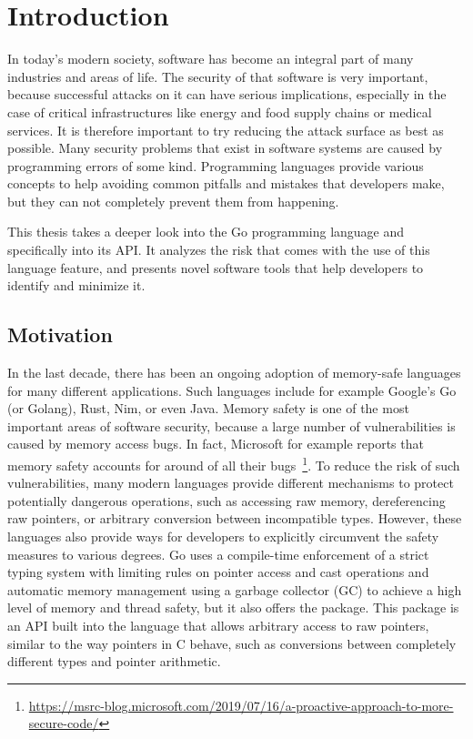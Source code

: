 
\chapter{Introduction}\label{ch:introduction}

In today's modern society, software has become an integral part of many industries and areas of life.
The security of that software is very important, because successful attacks on it can have serious implications,
especially in the case of critical infrastructures like energy and food supply chains or medical services.
It is therefore important to try reducing the attack surface as best as possible.
Many security problems that exist in software systems are caused by programming errors of some kind.
Programming languages provide various concepts to help avoiding common pitfalls and mistakes that developers make, but
they can not completely prevent them from happening.

This thesis takes a deeper look into the Go programming language and specifically into its \unsafe{} \acrshort{API}.
It analyzes the risk that comes with the use of this language feature, and presents novel software tools that help
developers to identify and minimize it.



\section{Motivation}\label{sec:introduction:motivation}

In the last decade, there has been an ongoing adoption of memory-safe languages for many different applications.
Such languages include for example Google's Go (or Golang), Rust, Nim, or even Java.
Memory safety is one of the most important areas of software security, because a large number of vulnerabilities is
caused by memory access bugs.
In fact, Microsoft for example reports that memory safety accounts for around  of all their
bugs~\footnote{\scriptsize\url{https://msrc-blog.microsoft.com/2019/07/16/a-proactive-approach-to-more-secure-code/}}.
To reduce the risk of such vulnerabilities, many modern languages provide different mechanisms to protect potentially
dangerous operations, such as accessing raw memory, dereferencing raw pointers, or arbitrary conversion between
incompatible types.
However, these languages also provide ways for developers to explicitly circumvent the safety measures to various
degrees.
Go uses a compile-time enforcement of a strict typing system with limiting rules on pointer access and cast operations
and automatic memory management using a garbage collector (\acrshort{GC}) to achieve a high level of memory and thread
safety, but it also offers the \unsafe{} package.
This package is an \acrshort{API} built into the language that allows arbitrary access to raw pointers, similar to the
way pointers in C behave, such as conversions between completely different types and pointer arithmetic.

